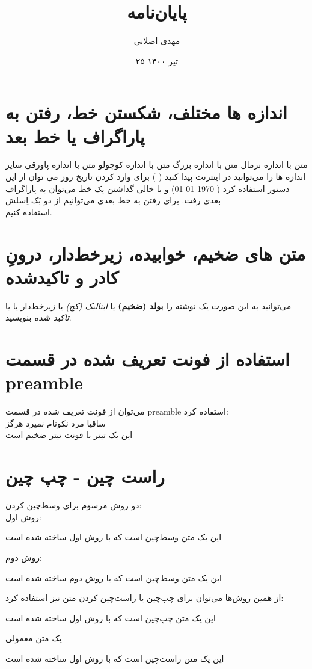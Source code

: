 \documentclass[12pt]{article}
\title{پایان‌نامه}
\author{مهدی اصلانی}
\date{۲۵ تیر ۱۴۰۰}
\begin{document}
\maketitle


\section{اندازه ها مختلف، شکستن خط، رفتن به پاراگراف یا خط بعد }


متن با اندازه نرمال
{\LARGE متن با اندازه بزرگ}
{\tiny  متن با اندازه کوچولو}
 {\footnotesize متن با اندازه پاورقی}
سایر اندازه ها را می‌توانید در اینترنت پیدا کنید (
)
  برای وارد کردن تاریخ روز می توان از این دستور استفاده کرد
( \today )
و با خالی گذاشتن یک خط می‌توان به پاراگراف بعدی رفت. برای رفتن به خط بعدی می‌توانیم از دو بَک اِسلش \\ استفاده کنیم.


\section{متن های ضخیم، خوابیده، زیرخط‌دار، درونِ کادر و تاکید‌شده}
می‌توانید به این صورت  یک نوشته را 
\textbf{بولد (ضخیم)}
یا
\textit{ایتالیک (کج)}
یا
\underline{زیرخط‌دار}
یا
یا
\emph{تاکید شده}
بنویسید.


\section{استفاده از فونت تعریف شده در قسمت preamble}
می‌توان از فونت تعریف شده در قسمت preamble استفاده کرد:\\
{\nast ساقیا مرد نکونام نمیرد هرگز}\\
{\titr این یک تیتر با فونت تیتر ضخیم است}

\newpage

\section{راست چین - چپ چین}
دو روش مرسوم برای وسط‌چین کردن:\\
روش اول:\\
\begin{center}
	این یک متن وسط‌چین است که با روش اول ساخته شده‌ است
\end{center}
روش دوم:\\
\centerline{	این یک متن وسط‌چین است که با روش دوم ساخته شده‌ است}
از همین روش‌ها می‌توان برای چپ‌چین یا راست‌چین کردن متن نیز استفاده کرد:\\
\begin{flushleft}
		این یک متن چپ‌چین است که با روش اول ساخته شده‌ است
\end{flushleft}

یک متن معمولی
\begin{flushright}
			این یک متن راست‌چین است که با روش اول ساخته شده‌ است
\end{flushright}
\end{document}
